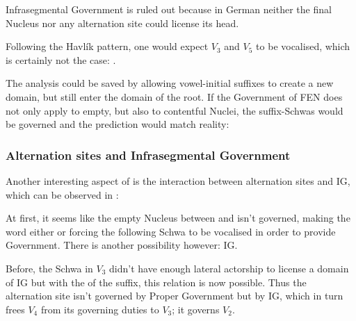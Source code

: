 Infrasegmental Government is ruled out because in German
neither the final Nucleus nor any alternation site could
license its head.

Following the Havlík pattern, one would expect $V_3$ and $V_5$
to be vocalised, which is certainly not the case: \ti{*[hand@ln@s]}.

The analysis could be saved by allowing vowel-initial suffixes
to create a new domain, but still enter the domain of the root.
If the Government of \gls{FEN} does not only apply to empty,
but also to contentful Nuclei, the suffix-Schwas would be governed
and the prediction would match reality:
\begin{structure}{ }
  \emptyV[gov]
  \V[floating]{\textschwa}
  \fen[domain]
  \V[floating]{\textschwa}
  \fen[domain]
  \V[floating]{\textschwa}
  \fen
\end{structure}


\subsubsection{Alternation sites and Infrasegmental Government}
Another interesting aspect of \CVCV is the interaction between alternation
sites and \gls{IG}, which can be observed in :

\begin{structure}{ \ti{[handlUN]}}
  \emptyV[nogov]
  \V[floating]{\textschwa}
  \Ng[nolic]
  \fen
\end{structure}

At first, it seems like the empty Nucleus between \ti{[n]} and \ti{[d]}
isn't governed, making the word either  or forcing
the following Schwa to be vocalised in order to provide Government.
There is another possibility however: \acrlong{IG}.

Before, the Schwa in $V_3$ didn't have
enough lateral actorship to license a domain of \gls{IG}
but with the \ti{[U]} of the suffix, this relation is
now possible. Thus the alternation site isn't governed
by Proper Government but by \gls{IG}, which in turn frees $V_4$ from
its governing duties to $V_3$; it governs $V_2$\footnotemark.

